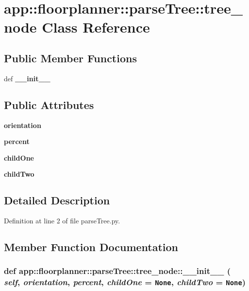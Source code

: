 \section{app::floorplanner::parseTree::tree\_\-node Class Reference}
\label{classapp_1_1floorplanner_1_1parseTree_1_1tree__node}
\subsection*{Public Member Functions}
\begin{CompactItemize}
\item 
def {\bf \_\-\_\-init\_\-\_\-}
\end{CompactItemize}
\subsection*{Public Attributes}
\begin{CompactItemize}
\item 
{\bf orientation}
\item 
{\bf percent}
\item 
{\bf childOne}
\item 
{\bf childTwo}
\end{CompactItemize}


\subsection{Detailed Description}


Definition at line 2 of file parseTree.py.

\subsection{Member Function Documentation}
\subsubsection{\setlength{\rightskip}{0pt plus 5cm}def app::floorplanner::parseTree::tree\_\-node::\_\-\_\-init\_\-\_\- ( {\em self},  {\em orientation},  {\em percent},  {\em childOne} = {\tt None},  {\em childTwo} = {\tt None})}\label{classapp_1_1floorplanner_1_1parseTree_1_1tree__node_f71ae34ea1b4e1615335a2b1ce94d665}




